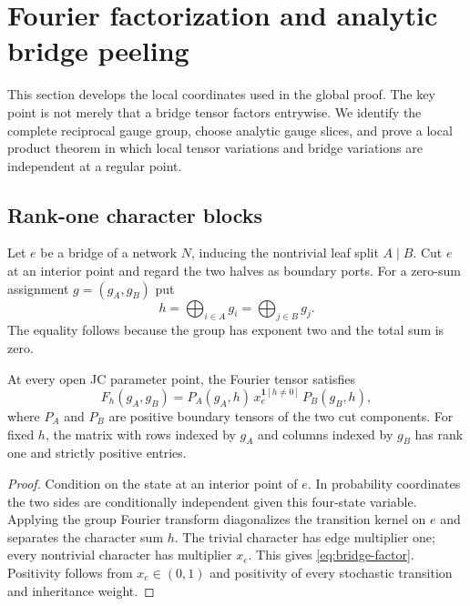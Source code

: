 \section{Fourier factorization and analytic bridge peeling}\label{sec:bridges}

This section develops the local coordinates used in the global proof.  The key point is not merely that a bridge tensor factors entrywise.  We identify the complete reciprocal gauge group, choose analytic gauge slices, and prove a local product theorem in which local tensor variations and bridge variations are independent at a regular point.

\subsection{Rank-one character blocks}

Let $e$ be a bridge of a network $N$, inducing the nontrivial leaf split $A\mid B$.  Cut $e$ at an interior point and regard the two halves as boundary ports.  For a zero-sum assignment $g=(g_A,g_B)$ put
\[
h=\bigoplus_{i\in A}g_i=\bigoplus_{j\in B}g_j.
\]
The equality follows because the group has exponent two and the total sum is zero.

\begin{proposition}\label{prop:bridge-factorization}
At every open JC parameter point, the Fourier tensor satisfies
\begin{equation}\label{eq:bridge-factor}
F_h(g_A,g_B)=P_A(g_A,h)\,x_e^{\mathbf 1[h\ne0]}\,P_B(g_B,h),
\end{equation}
where $P_A$ and $P_B$ are positive boundary tensors of the two cut components.  For fixed $h$, the matrix with rows indexed by $g_A$ and columns indexed by $g_B$ has rank one and strictly positive entries.
\end{proposition}

\begin{proof}
Condition on the state at an interior point of $e$.  In probability coordinates the two sides are conditionally independent given this four-state variable.  Applying the group Fourier transform diagonalizes the transition kernel on $e$ and separates the character sum $h$.  The trivial character has edge multiplier one; every nontrivial character has multiplier $x_e$.  This gives \eqref{eq:bridge-factor}.  Positivity follows from $x_e\in(0,1)$ and positivity of every stochastic transition and inheritance weight.
\end{proof}


